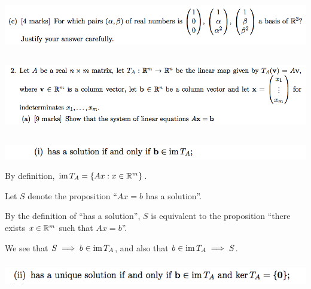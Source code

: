 \documentclass[12pt]{article}
\begin{document}
\begin{mdframed}
\includegraphics[width=400pt]{img/oxford-prelims-2017-A-1-3.png}
\end{mdframed}


\subsection*{}  %
\begin{mdframed}
\includegraphics[width=400pt]{img/oxford-prelims-2017-A-2-1.png}
\end{mdframed}

\subsection*{}  %
\begin{mdframed}
\includegraphics[width=400pt]{img/oxford-prelims-2017-A-2-1-1.png}
\end{mdframed}

By definition,  $\operatorname{\text{im}} T_A = \{Ax: x \in \mathbb{R}^m\}$.

Let $S$ denote the proposition ``$Ax = b$ has a solution''.

By the definition of ``has a solution'', $S$ is equivalent to the proposition
``there exists $x \in \mathbb{R}^m$ such that $Ax = b$''.

We see that $S \implies b \in \operatorname{\text{im}} T_A$, and also that $b \in \operatorname{\text{im}} T_A \implies S$.

\subsubsection*{} %
\begin{mdframed}
\includegraphics[width=400pt]{img/oxford-prelims-2017-A-2-1-2.png}
\end{mdframed}
\end{document}
